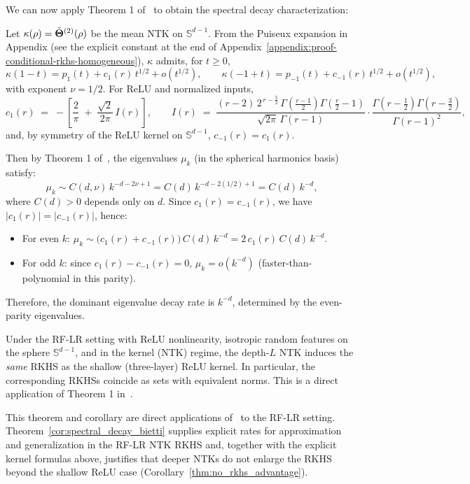 We can now apply Theorem 1 of~\cite{bietti2021deepequalsshallowrelu} to obtain the spectral decay characterization:

\begin{theorem}\label{cor:spectral_decay_bietti}
Let \( \kappa(\rho) = \tilde{\boldsymbol{\Theta}}^{(2)}(\rho) \) be the mean NTK on \( \mathbb{S}^{d-1} \). From the Puiseux expansion in Appendix (see the explicit constant at the end of Appendix~\ref{appendix:proof-conditional-rkhs-homogeneous}), \( \kappa \) admits, for \( t\ge 0 \),
\[
\kappa(1-t) = p_1(t) + c_1(r)\, t^{1/2} + o(t^{1/2}),\qquad
\kappa(-1+t) = p_{-1}(t) + c_{-1}(r)\, t^{1/2} + o(t^{1/2}),
\]
with exponent \( \nu = 1/2 \). For ReLU and normalized inputs,
\[
c_1(r) \;=\; -\left[\frac{2}{\pi} \;+\; \frac{\sqrt{2}}{2\pi}\,I(r)\right],
\qquad
I(r) \;=\; \frac{(r-2)\,2^{\,r-\frac{5}{2}}\,\Gamma\!\left(\frac{r-1}{2}\right)\Gamma\!\left(\frac{r}{2}-1\right)}{\sqrt{2\pi}\,\Gamma(r-1)}\cdot\frac{\Gamma\!\left(r-\tfrac{1}{2}\right)\Gamma\!\left(r-\tfrac{3}{2}\right)}{\Gamma(r-1)^2},
\]
and, by symmetry of the ReLU kernel on \( \mathbb{S}^{d-1} \), \( c_{-1}(r) = c_1(r) \).

Then by Theorem 1 of~\cite{bietti2021deepequalsshallowrelu}, the eigenvalues \( \mu_k \) (in the spherical harmonics basis) satisfy:
\[
\mu_k \sim C(d,\nu)\,k^{-d-2\nu+1} = C(d)\,k^{-d-2(1/2)+1} = C(d)\,k^{-d},
\]
where \( C(d) > 0 \) depends only on \( d \). Since \( c_1(r) = c_{-1}(r) \), we have \( |c_1(r)| = |c_{-1}(r)| \), hence:
\begin{itemize}
    \item For even \( k \): \( \mu_k \sim \big(c_1(r)+c_{-1}(r)\big)\,C(d)\,k^{-d} = 2\,c_1(r)\,C(d)\,k^{-d} \).
    \item For odd \( k \): since \( c_1(r) - c_{-1}(r) = 0 \), \( \mu_k = o(k^{-d}) \) (faster-than-polynomial in this parity).
\end{itemize}
Therefore, the dominant eigenvalue decay rate is \( k^{-d} \), determined by the even-parity eigenvalues.
\end{theorem}

\begin{corollary}\label{thm:no_rkhs_advantage}
Under the RF-LR setting with ReLU nonlinearity, isotropic random features on the sphere \( \mathbb{S}^{d-1} \), and in the kernel (NTK) regime, the depth-\(L\) NTK induces the \emph{same} RKHS as the shallow (three-layer) ReLU kernel. In particular, the corresponding RKHSs coincide as sets with equivalent norms. This is a direct application of Theorem 1 in~\cite{bietti2021deepequalsshallowrelu}.
\end{corollary}

\begin{remark}
This theorem and corollary are direct applications of~\cite{bietti2021deepequalsshallowrelu} to the RF-LR setting. Theorem~\ref{cor:spectral_decay_bietti} supplies explicit rates for approximation and generalization in the RF-LR NTK RKHS and, together with the explicit kernel formulas above, justifies that deeper NTKs do not enlarge the RKHS beyond the shallow ReLU case (Corollary~\ref{thm:no_rkhs_advantage}).
\end{remark}
